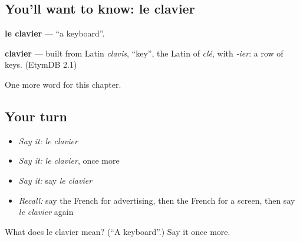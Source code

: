 \subsection*{You'll want to know: le clavier}
\textbf{le clavier} — \textquotedblleft{}a keyboard\textquotedblright{}.

\begin{cousinweb}
\textbf{clavier} — built from Latin \emph{clavis}, \textquotedblleft{}key\textquotedblright{}, the Latin of \emph{clé}, with \emph{-ier}: a row of keys. (EtymDB 2.1)
\end{cousinweb}

\begin{grammarlens}[title={What you've built}]
One more word for this chapter.
\end{grammarlens}

\subsection*{Your turn}
\begin{itemize}
\raggedright
  \item \emph{Say it:} \emph{le clavier}
  \item \emph{Say it:} \emph{le clavier}, once more
  \item \emph{Say it:} say \emph{le clavier}
  \item \emph{Recall:} say the French for advertising, then the French for a screen, then say \emph{le clavier} again
\end{itemize}

\begin{tcolorbox}[breakable,colback=teal!4,colframe=teal!35!black,title={Before you move on}]
What does le clavier mean? (\textquotedblleft{}A keyboard\textquotedblright{}.) Say it once more.
\end{tcolorbox}
